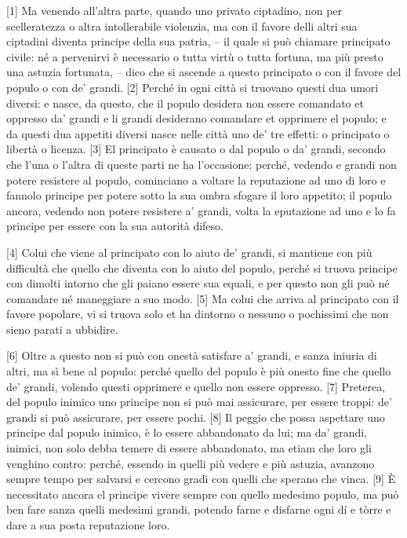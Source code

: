 {[}1{]} Ma venendo all'altra parte, quando uno privato ciptadino, non
per scelleratezza o altra intollerabile violenzia, ma con il favore
delli altri sua ciptadini diventa principe della sua patria, -- il quale
si può chiamare principato civile: né a pervenirvi è necessario o tutta
virtù o tutta fortuna, ma più presto una astuzia fortunata, -- dico che si ascende a questo principato o con il favore del populo o con de' grandi. {[}2{]} Perché in ogni città si truovano questi dua umori diversi: e nasce, da questo, che il populo desidera non essere comandato et oppresso da' grandi e li grandi desiderano comandare et opprimere el populo; e da questi dua appetiti diversi nasce nelle città uno de' tre effetti: o principato o libertà o licenza. {[}3{]} El principato è causato o dal populo o da' grandi, secondo che l'una o l'altra di queste parti ne ha l'occasione: perché, vedendo e grandi non potere resistere al populo, cominciano a voltare la reputazione ad uno di loro e fannolo principe per potere sotto la sua ombra sfogare il loro appetito; il populo ancora, vedendo non potere resistere a' grandi, volta la eputazione ad uno e lo fa principe per essere con la sua autorità difeso.

{[}4{]} Colui che viene al principato con lo aiuto de' grandi, si
mantiene con più difficultà che quello che diventa con lo aiuto del
populo, perché si truova principe con dimolti intorno che gli paiano
essere sua equali, e per questo non gli può né comandare né maneggiare a
suo modo. {[}5{]} Ma colui che arriva al principato con il favore
popolare, vi si truova solo et ha dintorno o nessuno o pochissimi che
non sieno parati a ubbidire.

{[}6{]} Oltre a questo non si può con onestà satisfare a' grandi, e
sanza iniuria di altri, ma sì bene al populo: perché quello del populo è
più onesto fine che quello de' grandi, volendo questi opprimere e quello
non essere oppresso. {[}7{]} Preterea, del populo inimico uno principe
non si può mai assicurare, per essere troppi: de' grandi si può
assicurare, per essere pochi. {[}8{]} Il peggio che possa aspettare uno
principe dal populo inimico, è lo essere abbandonato da lui; ma da'
grandi, inimici, non solo debba temere di essere abbandonato, ma etiam
che loro gli venghino contro: perché, essendo in quelli più vedere e più
astuzia, avanzono sempre tempo per salvarsi e cercono gradi con quelli
che sperano che vinca. {[}9{]} È necessitato ancora el principe vivere
sempre con quello medesimo populo, ma può ben fare sanza quelli medesimi
grandi, potendo farne e disfarne ogni dí e tòrre e dare a sua posta
reputazione loro.

